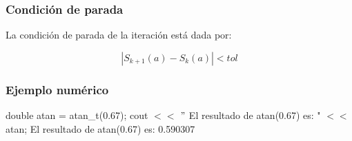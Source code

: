 \documentclass[10pt,a4paper]{article}
\begin{document}
	\subsubsection{Condición de parada}
	
	La condición de parada de la iteración está dada por: 
	
	\begin{equation}\label{key9}
		\left\lvert S_{k+1}(a) - S_{k}(a) \right\lvert < tol
	\end{equation}
	
	\subsubsection{Ejemplo numérico}

	double atan = atan{\_}t(0.67); \newline
	cout $<<$ $"$ El resultado de atan(0.67) es: " $<<$ atan; \newline
	El resultado de atan(0.67) es: 0.590307\newline
	
	
\end{document}
